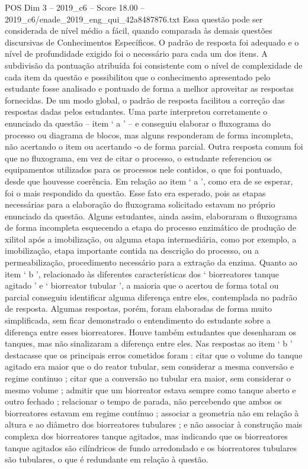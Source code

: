 \begin{textsample}{POS Dim 3 – 2019\_c6 – Score 18.00 – 2019\_c6/enade\_2019\_eng\_qui\_42a8487876.txt}
Essa questão pode ser considerada de nível médio a fácil, quando comparada às demais questões discursivas de Conhecimentos Específicos.
O padrão de resposta foi adequado e o nível de profundidade exigido foi o necessário para cada um dos itens.
A subdivisão da pontuação atribuída foi consistente com o nível de complexidade de cada item da questão e possibilitou que o conhecimento apresentado pelo estudante fosse analisado e pontuado de forma a melhor aproveitar as respostas fornecidas.
De um modo global, o padrão de resposta facilitou a correção das respostas dadas pelos estudantes.
Uma parte interpretou corretamente o enunciado da questão – item ‘ a ’ – e conseguiu elaborar o fluxograma do processo ou diagrama de blocos, mas alguns responderam de forma incompleta, não acertando o item ou acertando -o de forma parcial.
Outra resposta comum foi que no fluxograma, em vez de citar o processo, o estudante referenciou os equipamentos utilizados para os processos nele contidos, o que foi pontuado, desde que houvesse coerência.
Em relação ao item ‘ a ’, como era de se esperar, foi o mais respondido da questão.
Esse fato era esperado, pois as etapas necessárias para a elaboração do fluxograma solicitado estavam no próprio enunciado da questão.
Alguns estudantes, ainda assim, elaboraram o fluxograma de forma incompleta esquecendo a etapa do processo enzimático de produção de xilitol após a imobilização, ou alguma etapa intermediária, como por exemplo, a imobilização, etapa importante contida na descrição do processo, ou a permeabilização, procedimento necessário para a extração da enzima.
Quanto ao item ‘ b ’, relacionado às diferentes características dos ‘ biorreatores tanque agitado ’ e ‘ biorreator tubular ’, a maioria que o acertou de forma total ou parcial conseguiu identificar alguma diferença entre eles, contemplada no padrão de resposta.
Algumas respostas, porém, foram elaboradas de forma muito simplificada, sem ficar demonstrado o entendimento do estudante sobre a diferença entre esses biorreatores.
Houve também estudantes que desenharam os tanques, mas não sinalizaram a diferença entre eles.
Nas respostas ao item ‘ b ’ destacasse que os principais erros cometidos foram : citar que o volume do tanque agitado era maior que o do reator tubular, sem considerar a mesma conversão e regime continuo ; citar que a conversão no tubular era maior, sem considerar o mesmo volume ; admitir que um biorreator estava sempre como tanque aberto e outro fechado ; relacionar o tempo de parada, não percebendo que ambos os biorreatores estavam em regime contínuo ; associar a geometria não em relação à altura e ao diâmetro dos biorreatores tubulares ; e não associar à construção mais complexa dos biorreatores tanque agitados, mas indicando que os biorreatores tanque agitados são cilíndricos de fundo arredondado e os biorreatores tubulares são tubulares, o que é redundante em relação à questão.

\end{textsample}
